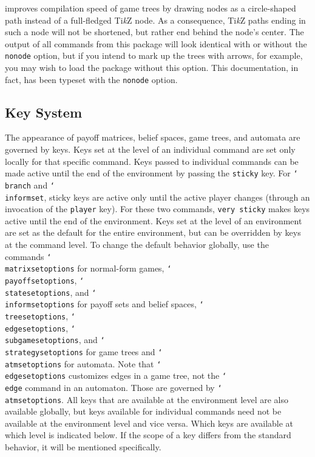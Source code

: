 \documentclass{article}
\newenvironment{desc}{\itemize[leftmargin=50pt]}{\enditemize}
\def\noption#1{\item[\texttt{#1}]}
\def\option#1#2{\item[\texttt{#1}] \hskip-1.5pt\texttt{#2}}
\renewcommand{\textbackslash}{\char`\\}
\def\cmd#1{\texttt{\color{cmd}\textbackslash#1}}
\def\TikZ{Ti\emph{k}Z\xspace}
\begin{document}
\begin{desc}
\noption{nonode} improves compilation speed of game trees by drawing nodes as a circle-shaped path instead of a full-fledged \TikZ node. As a consequence, \TikZ paths ending in such a node will not be shortened, but rather end behind the node's center. The output of all commands from this package will look identical with or without the \texttt{nonode} option, but if you intend to mark up the trees with arrows, for example, you may wish to load the package without this option. This documentation, in fact, has been typeset with the \texttt{nonode} option.
\end{desc}

\subsection{Key System}

The appearance of payoff matrices, belief spaces, game trees, and automata are governed by keys. Keys set at the level of an individual command are set only locally for that specific command. Keys passed to individual commands can be made active until the end of the environment by passing the \texttt{sticky} key. For \cmd{branch} and \cmd{informset}, sticky keys are active only until the active player changes (through an invocation of the \texttt{player} key). For these two commands, \texttt{very sticky} makes keys active until the end of the environment. Keys set at the level of an environment are set as the default for the entire environment, but can be overridden by keys at the command level. To change the default behavior globally, use the commands \cmd{matrixsetoptions} for normal-form games, \cmd{payoffsetoptions}, \cmd{statesetoptions}, and \cmd{informsetoptions} for payoff sets and belief spaces, \cmd{treesetoptions}, \cmd{edgesetoptions}, \cmd{subgamesetoptions}, and \cmd{strategysetoptions} for game trees and \cmd{atmsetoptions} for automata. Note that \cmd{edgesetoptions} customizes edges in a game tree, not the \cmd{edge} command in an automaton. Those are governed by \cmd{atmsetoptions}.
%
All keys that are available at the environment level are also available globally, but keys available for individual commands need not be available at the environment level and vice versa. Which keys are available at which level is indicated below. If the scope of a key differs from the standard behavior, it will be mentioned specifically.
\end{document}
